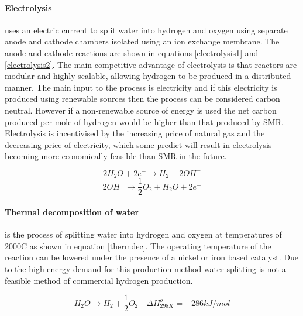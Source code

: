 \paragraph{Electrolysis} uses an electric current to split water into hydrogen and oxygen using separate anode and cathode chambers isolated using an ion exchange membrane. The anode and cathode reactions are shown in equations \ref{electrolysis1} and \ref{electrolysis2}. The main competitive advantage of electrolysis is that reactors are modular and highly scalable, allowing hydrogen to be produced in a distributed manner. \cite{Acar2014} The main input to the process is electricity and if this electricity is produced using renewable sources then the process can be considered carbon neutral. However if a non-renewable source of energy is used the net carbon produced per mole of hydrogen would be higher than that produced by SMR. \cite{Koroneos2004}
Electrolysis is incentivised by the increasing price of natural gas and the decreasing price of electricity, which some predict will result in electrolysis becoming more economically feasible than SMR in the future. \cite{Acar2014}

\begin{equation}\label{electrolysis1}
2H_2 O +  2e^- \rightarrow H_2 + 2OH^-
\end{equation}
\begin{equation}\label{electrolysis2}
2OH^- \rightarrow \frac{1}{2}O_2+ H_2 O + 2e^-
\end{equation}

\paragraph{Thermal decomposition of water} is the process of splitting water into hydrogen and oxygen at temperatures of 2000\textdegree C as shown in equation \ref{thermdec}. \cite{Holladay2009} The operating temperature of the reaction can be lowered under the presence of a nickel or iron based catalyst. \cite{Holladay2009} Due to the high energy demand for this production method water splitting is not a feasible method of commercial hydrogen production.

\begin{equation}\label{thermdec}
    H_2 O \rightarrow H_2 + \frac{1}{2} O_2  \quad \Delta H_{298K}^o = +286 kJ/mol
\end{equation}

